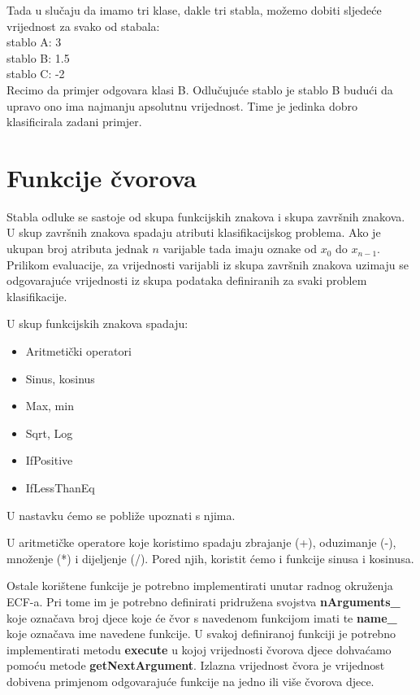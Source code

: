 \documentclass[times, utf8, zavrsni]{fer}
\begin{document}
Tada u slučaju da imamo tri klase, dakle tri stabla, možemo dobiti sljedeće vrijednost za svako od stabala: \\
stablo A: 3 \\
stablo B: 1.5 \\
stablo C: -2 \\

Recimo da primjer odgovara klasi B. Odlučujuće stablo je stablo B budući da upravo ono ima najmanju apsolutnu vrijednost. Time je jedinka dobro klasificirala zadani primjer.


\section{Funkcije čvorova}

Stabla odluke se sastoje od skupa funkcijskih znakova i skupa završnih znakova. U skup završnih znakova spadaju atributi klasifikacijskog problema. Ako je ukupan broj atributa jednak $n$ varijable tada imaju oznake od $x_0$ do $x_{n-1}$. Prilikom evaluacije, za vrijednosti varijabli iz skupa završnih znakova uzimaju se odgovarajuće vrijednosti iz skupa podataka definiranih za svaki problem klasifikacije.

U skup funkcijskih znakova spadaju:

\begin{itemize}
\item Aritmetički operatori
\item Sinus, kosinus
\item Max, min
\item Sqrt, Log
\item IfPositive
\item IfLessThanEq
\end{itemize}

U nastavku ćemo se pobliže upoznati s njima.

U aritmetičke operatore koje koristimo spadaju zbrajanje (+), oduzimanje (-), množenje (*) i dijeljenje (/). Pored njih, koristit ćemo i funkcije sinusa i kosinusa. 

Ostale korištene funkcije je potrebno implementirati unutar radnog okruženja ECF-a. Pri tome im je potrebno definirati pridružena svojstva \textbf{nArguments\_} koje označava broj djece koje će čvor s navedenom funkcijom imati te \textbf{name\_} koje označava ime navedene funkcije. U svakoj definiranoj funkciji je potrebno implementirati metodu \textbf{execute} u kojoj vrijednosti čvorova djece dohvaćamo pomoću metode \textbf{getNextArgument}. Izlazna vrijednost čvora je vrijednost dobivena primjenom odgovarajuće funkcije na jedno ili više čvorova djece.
\end{document}
